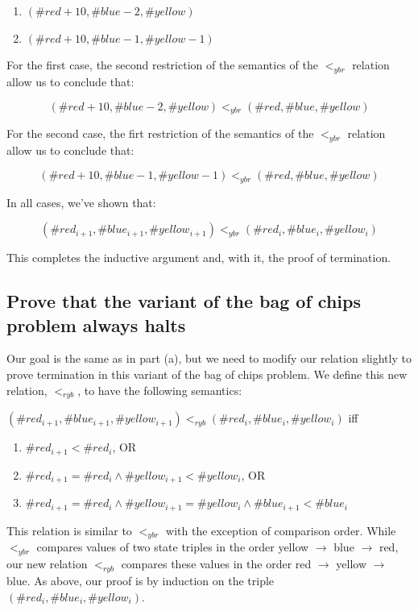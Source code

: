 \documentclass{article}
\begin{document}
\begin{enumerate}
  \item $(\#red + 10, \#blue - 2, \#yellow)$
  \item $(\#red + 10, \#blue - 1, \#yellow - 1)$
\end{enumerate}


For the first case, the second restriction of the semantics of the $<_{ybr}$ relation allow us to conclude that:

$$
(\#red + 10, \#blue - 2, \#yellow) <_{ybr} (\#red, \#blue, \#yellow)
$$

For the second case, the firt restriction of the semantics of the $<_{ybr}$ relation allow us to conclude that:

$$
(\#red + 10, \#blue - 1, \#yellow - 1) <_{ybr} (\#red, \#blue, \#yellow)
$$

In all cases, we've shown that:

$$
(\#red_{i + 1}, \#blue_{i + 1}, \#yellow_{i + 1}) <_{ybr}(\#red_i, \#blue_i, \#yellow_i)
$$

This completes the inductive argument and, with it, the proof of termination.

\subsection{Prove that the variant of the bag of chips problem always halts}

Our goal is the same as in part (a), but we need to modify our relation slightly to prove termination in this variant of the bag of chips problem. We define this new relation, $<_{ryb}$, to have the following semantics:

$(\#red_{i + 1}, \#blue_{i + 1}, \#yellow_{i + 1}) <_{ryb} (\#red_i, \#blue_i, \#yellow_i)$ iff

\begin{enumerate}
  \item $\#red_{i + 1} < \#red_i$, OR
  \item $\#red_{i + 1} = \#red_i \land \#yellow_{i + 1} < \#yellow_i$, OR
  \item $\#red_{i + 1} = \#red_i \land \#yellow_{i + 1} = \#yellow_i \land \#blue_{i + 1} < \#blue_i$
\end{enumerate}

This relation is similar to $<_{ybr}$ with the exception of comparison order. While $<_{ybr}$ compares values of two state triples in the order yellow $\rightarrow$ blue $\rightarrow$ red, our new relation $<_{ryb}$ compares these values in the order red $\rightarrow$ yellow $\rightarrow$ blue. As above, our proof is by induction on the triple $(\#red_i, \#blue_i, \#yellow_i)$.
\end{document}
